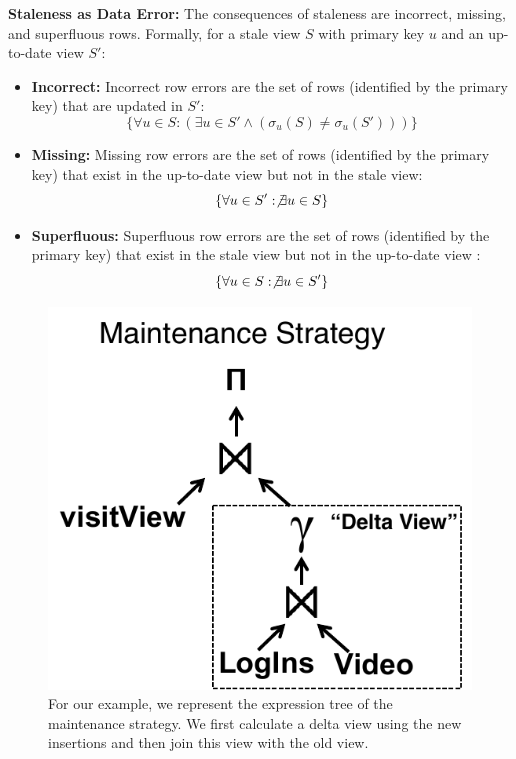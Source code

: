 \noindent \textbf{Staleness as Data Error: } The consequences of staleness are incorrect, missing, and superfluous rows. 
Formally, for a stale view $S$ with primary key $u$ and an up-to-date view $S'$:
\begin{itemize}[noitemsep] \sloppy
	\item \textbf{Incorrect: } Incorrect row errors are the set of rows (identified by the primary key) that are updated in $S'$: \[\{\forall u \in S : (\exists u \in S' \wedge (\sigma_u(S) \ne \sigma_u(S')))\}\]
	\item \textbf{Missing: } Missing row errors are the set of rows (identified by the primary key) that exist in the up-to-date view but not in the stale view: \[\{\forall u \in S' : \not \exists u \in S\}\]
	\item \textbf{Superfluous: } Superfluous row errors are the set of rows (identified by the primary key) that exist in the stale view but not in the up-to-date view : \[\{ \forall u \in S : \not\exists u \in S' \}\]
\end{itemize}

\vspace{.25em}

\iffalse
\begin{figure}[t] \vspace{-2em}
\centering
 \includegraphics[scale=0.32]{figs/example_expression_tree.pdf} \vspace{-.5em}
 \caption{ For our example, we represent the expression tree of the maintenance strategy. We first calculate a delta view using the new insertions and then join this view with the old view.\label{exexpr}}\vspace{-1.5em}
\end{figure}

